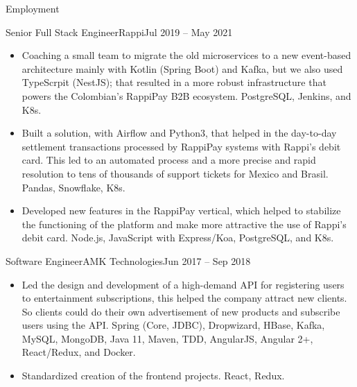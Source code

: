 \documentclass[calibri]{../mcdowell-cv/mcdowellcv}
\begin{document}
\begin{cvsection}{Employment}
		\begin{cvsubsection}{Senior Full Stack Engineer}{Rappi}{Jul 2019 -- May 2021}
			\begin{itemize}
				\item Coaching a small team to migrate the old microservices to a new event-based architecture mainly with Kotlin (Spring Boot) and Kafka, but we also used TypeScrpit (NestJS); that resulted in a more robust infrastructure that powers the Colombian's RappiPay B2B ecosystem. PostgreSQL, Jenkins, and K8s.
				\item Built a solution, with Airflow and Python3, that helped in the day-to-day settlement transactions processed by RappiPay systems with Rappi's debit card. This led to an automated process and a more precise and rapid resolution to tens of thousands of support tickets for Mexico and Brasil. Pandas, Snowflake, K8s.
				\item Developed new features in the RappiPay vertical, which helped to stabilize the functioning of the platform and make more attractive the use of Rappi's debit card. Node.js, JavaScript with Express/Koa, PostgreSQL, and K8s.
			\end{itemize}
		\end{cvsubsection}

		\pagebreak

		\begin{cvsubsection}{Software Engineer}{AMK Technologies}{Jun 2017 -- Sep 2018}
			\begin{itemize}
				\item Led the design and development of a high-demand API for registering users to entertainment subscriptions, this helped the company attract new clients. So clients could do their own advertisement of new products and subscribe users using the API. Spring (Core, JDBC), Dropwizard, HBase, Kafka, MySQL, MongoDB, Java 11, Maven, TDD, AngularJS, Angular 2+, React/Redux, and Docker.
				\item Standardized creation of the frontend projects. React, Redux.
			\end{itemize}
		\end{cvsubsection}


\end{cvsection}
\end{document}
